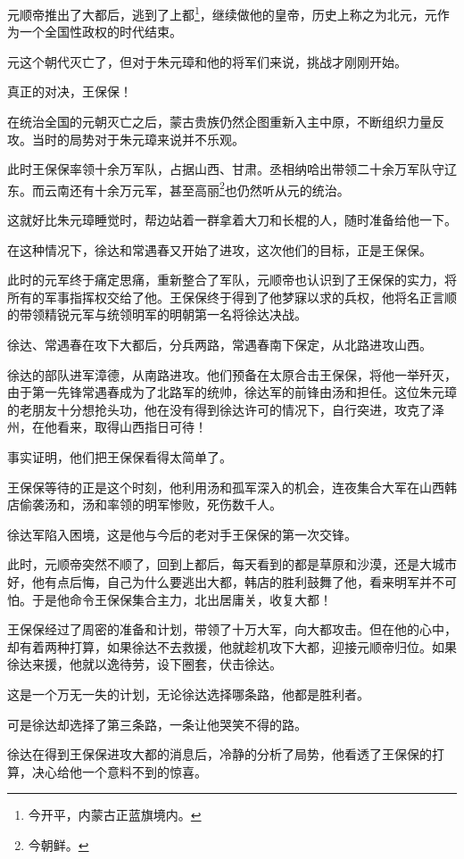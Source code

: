 \begin{multicols}{\theparacolNo}
		元顺帝推出了大都后，逃到了上都\footnote{今开平，内蒙古正蓝旗境内。}，继续做他的皇帝，历史上称之为北元，元作为一个全国性政权的时代结束。

		元这个朝代灭亡了，但对于朱元璋和他的将军们来说，挑战才刚刚开始。

		真正的对决，王保保！

		在统治全国的元朝灭亡之后，蒙古贵族仍然企图重新入主中原，不断组织力量反攻。当时的局势对于朱元璋来说并不乐观。

		此时王保保率领十余万军队，占据山西、甘肃。丞相纳哈出带领二十余万军队守辽东。而云南还有十余万元军，甚至高丽\footnote{今朝鲜。}也仍然听从元的统治。

		这就好比朱元璋睡觉时，帮边站着一群拿着大刀和长棍的人，随时准备给他一下。

		在这种情况下，徐达和常遇春又开始了进攻，这次他们的目标，正是王保保。

		此时的元军终于痛定思痛，重新整合了军队，元顺帝也认识到了王保保的实力，将所有的军事指挥权交给了他。王保保终于得到了他梦寐以求的兵权，他将名正言顺的带领精锐元军与统领明军的明朝第一名将徐达决战。

		徐达、常遇春在攻下大都后，分兵两路，常遇春南下保定，从北路进攻山西。

		徐达的部队进军漳德，从南路进攻。他们预备在太原合击王保保，将他一举歼灭，由于第一先锋常遇春成为了北路军的统帅，徐达军的前锋由汤和担任。这位朱元璋的老朋友十分想抢头功，他在没有得到徐达许可的情况下，自行突进，攻克了泽州，在他看来，取得山西指日可待！

		事实证明，他们把王保保看得太简单了。

		王保保等待的正是这个时刻，他利用汤和孤军深入的机会，连夜集合大军在山西韩店偷袭汤和，汤和率领的明军惨败，死伤数千人。

		徐达军陷入困境，这是他与今后的老对手王保保的第一次交锋。

		此时，元顺帝突然不顺了，回到上都后，每天看到的都是草原和沙漠，还是大城市好，他有点后悔，自己为什么要逃出大都，韩店的胜利鼓舞了他，看来明军并不可怕。于是他命令王保保集合主力，北出居庸关，收复大都！

		王保保经过了周密的准备和计划，带领了十万大军，向大都攻击。但在他的心中，却有着两种打算，如果徐达不去救援，他就趁机攻下大都，迎接元顺帝归位。如果徐达来援，他就以逸待劳，设下圈套，伏击徐达。

		这是一个万无一失的计划，无论徐达选择哪条路，他都是胜利者。

		可是徐达却选择了第三条路，一条让他哭笑不得的路。

		徐达在得到王保保进攻大都的消息后，冷静的分析了局势，他看透了王保保的打算，决心给他一个意料不到的惊喜。


\end{multicols}
